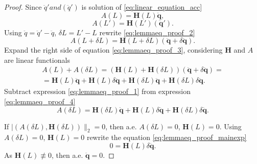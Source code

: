 \documentclass[sn-mathphys-num]{sn-jnl}
\theoremstyle{thmstylethree}
\theoremstyle{thmstyletwo}
\theoremstyle{thmstyleone}
\begin{document}
\begin{proof}

Since $\ddot{q}' and (\ddot{q}')$ is solution of \ref{eq:linear_equation_acc} 
\begin{equation}
\label{eq:lemmaeq_proof_1}
A(L) = \mathbf{H}(L)\ddot{\mathbf{q}},
\end{equation}
\begin{equation}
\label{eq:lemmaeq_proof_2}
A(L') = \mathbf{H}(L')(\ddot{\mathbf{q}}').
\end{equation}
Using $\ddot{q} = \ddot{q}' - \ddot{q}$, $\delta L = L' - L$ rewrite \ref{eq:lemmaeq_proof_2}
\begin{equation}
\label{eq:lemmaeq_proof_3}
A(L+\delta L) = \mathbf{H}(L+\delta L)(\ddot{\mathbf{q}} + \delta \ddot{\mathbf{q}}).
\end{equation}
Expand the right side of equation \ref{eq:lemmaeq_proof_3}, considering $\mathbf{H}$ and $A$ are linear functionals
\begin{equation}
\label{eq:lemmaeq_proof_4}
\begin{split}
A(L)+A(\delta L) = (\mathbf{H}(L)+\mathbf{H}(\delta L))(\ddot{\mathbf{q}} + \delta \ddot{\mathbf{q}})=
\\
 = 
\mathbf{H}(L)\ddot{\mathbf{q}} + \mathbf{H}(L)\delta \ddot{\mathbf{q}} + \mathbf{H}(\delta L)\ddot{\mathbf{q}} + \mathbf{H}(\delta L)\delta \ddot{\mathbf{q}}.
\end{split}
\end{equation}
Subtract expression \ref{eq:lemmaeq_proof_1} from expression \ref{eq:lemmaeq_proof_4}
\begin{equation}
\label{eq:lemmaeq_proof_mainexp}
A(\delta L) = \mathbf{H}(\delta L)\ddot{\mathbf{q}} + \mathbf{H}(L)\delta \ddot{\mathbf{q}} + \mathbf{H}(\delta L)\delta \ddot{\mathbf{q}}.
\end{equation}

If $|(A(\delta L), \mathbf{H}(\delta L))\|_2 = 0$, then a.e. $A(\delta L) = 0$, $\mathbf{H}(L) = 0$. Using $A(\delta L) = 0$, $\mathbf{H}(L) = 0$ rewrite the equation
\ref{eq:lemmaeq_proof_mainexp}
\begin{equation}
\label{eq:lemmaeq_proof_5}
0 = \mathbf{H}(L)\delta \ddot{\mathbf{q}}.
\end{equation}
As $\mathbf{H}(L) \not\equiv0$, then a.e. $\ddot{\mathbf{q}} = 0$.


\end{proof}
\end{document}
